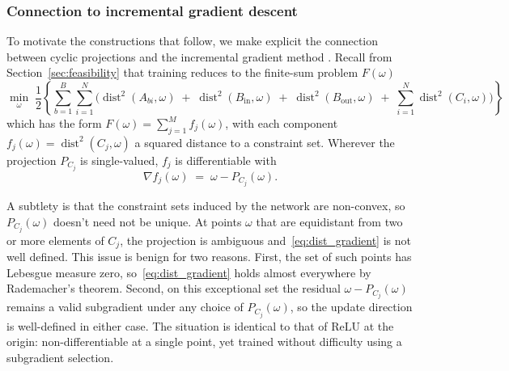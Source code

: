 \documentclass{article}
\DeclareMathOperator{\dist}{dist}
\theoremstyle{plain}
\theoremstyle{definition}
\theoremstyle{remark}
\begin{document}
\subsubsection{Connection to incremental gradient descent}
To motivate the constructions that follow, we make explicit the connection between cyclic projections and the incremental gradient method \cite{bertsekas1997nonlinear}. Recall from Section~\ref{sec:feasibility} that training reduces to the finite-sum problem $F(\omega)$
\[
    \min_{\omega} \; \frac{1}{2}\left\{\sum_{b=1}^{B}\sum_{i=1}^{N} \bigl(\dist^{2}(A_{bi}, \omega) \;+\; \dist^{2}(B_{\mathrm{in}}, \omega) \;+\; \dist^{2}(B_{\mathrm{out}}, \omega) \;+\; \sum_{i=1}^{N} \dist^{2}(C_i, \omega)\bigr)\right\}
    \label{eq:finite_sum}
\]
which has the form $F(\omega) = \sum_{j=1}^{M} f_j(\omega)$, with each component $f_j(\omega) = \dist^{2}(C_j, \omega)$ a squared distance to a constraint set. Wherever the projection $P_{C_j}$ is single-valued, $f_j$ is differentiable with
\begin{equation}
    \nabla f_j(\omega) \;=\; \omega - P_{C_j}(\omega).
    \label{eq:dist_gradient}
\end{equation}

A subtlety is that the constraint sets induced by the network are non-convex, so $P_{C_j}(\omega)$ doesn't need not be unique. At points $\omega$ that are equidistant from two or more elements of $C_j$, the projection is ambiguous and~\eqref{eq:dist_gradient} is not well defined. This issue is benign for two reasons. First, the set of such points has Lebesgue measure zero, so~\eqref{eq:dist_gradient} holds almost everywhere by Rademacher's theorem. Second, on this exceptional set the residual $\omega - P_{C_j}(\omega)$ remains a valid subgradient under any choice of $P_{C_j}(\omega)$, so the update direction is well-defined in either case. The situation is identical to that of $\mathrm{ReLU}$ at the origin: non-differentiable at a single point, yet trained without difficulty using a subgradient selection. 
\end{document}

